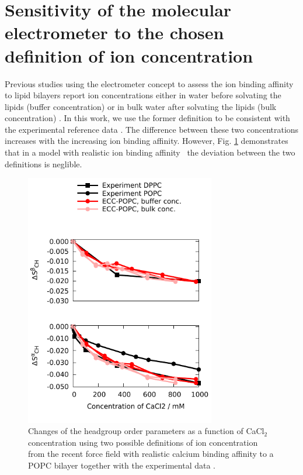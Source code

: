 \documentclass[journal=jpcbfk,manuscript=article]{achemso}
\begin{document}
\section{Sensitivity of the molecular electrometer to the chosen definition of ion concentration}\label{concentrationDEFsection}
Previous studies using the electrometer concept to assess the ion binding affinity to lipid
bilayers report ion concentrations either in water before solvating the lipids (buffer concentration) \cite{akutsu81,roux90,catte16}
or in bulk water after solvating the lipids (bulk concentration) \cite{altenbach84,melcr18}.
In this work, we use the former definition to be consistent with the experimental reference data \cite{roux90}. The difference between these two concentrations increases
with the increasing ion binding affinity. However, Fig. \ref{concentrationDEFfigure} demonstrates that 
in a model with realistic ion binding affinity~\cite{melcr18} the deviation between the two definitions is neglible.
\begin{figure}[]
  \centering
  \includegraphics[width=8.3cm]{../Figs/OP_ECC_POPC_DPPC_water_conc2_dppc_bulk.pdf}
  \caption{\label{concentrationDEFfigure}
    Changes of the headgroup order parameters as a function of CaCl$_2$ concentration using
    two possible definitions of ion concentration from the recent force field
    with realistic calcium binding affinity to a POPC bilayer \cite{melcr18}
    together with the experimental data \cite{akutsu81,altenbach84}. 
  }
\end{figure}
\end{document}
